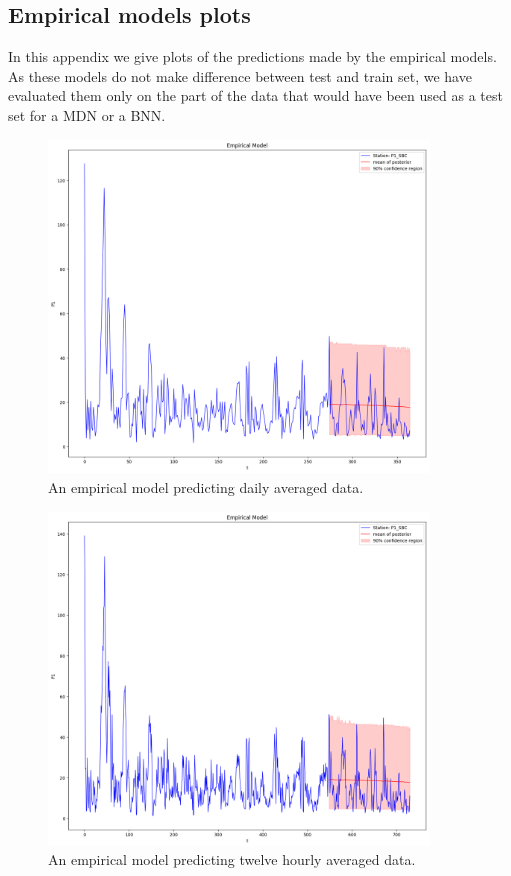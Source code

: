 \documentclass[12pt,a4paper,twoside]{scrartcl}
\numberwithin{equation}{section}
\newcounter{mypagecount}%
\newenvironment{interlude}{%
  \clearpage
  \setcounter{mypagecount}{\value{page}}%
  \thispagestyle{empty}%
  \pagestyle{empty}%
}{%
  \clearpage
  \setcounter{page}{\value{mypagecount}}%
}
\let\chapter=\section %
\begin{document}
\begin{interlude}
\begin{appendices}
    \chapter{Empirical models plots}\label{app:h}
    In this appendix we give plots of the predictions made by the empirical models. As these models do not make difference between test and train set, we have evaluated them only on the part of the data that would have been used as a test set for a MDN or a BNN.

    \begin{center}
      \begin{figure}[h!]
        \centering
        \includegraphics[height=0.5\textwidth, width=0.9\textwidth]{figures/model_plots/emp-1d}
        \caption[Empirical one day plot]{An empirical model predicting daily averaged data.}\label{fig:emp-1d}
      \end{figure}
    \end{center}
    \begin{center}
      \begin{figure}[h!]
        \centering
        \includegraphics[height=0.5\textwidth, width=0.9\textwidth]{figures/model_plots/emp-12h}
        \caption[Empirical twelve hour plot]{An empirical model predicting twelve hourly averaged data.}\label{fig:emp-12h}

\end{figure}
\end{center}
\end{appendices}
\end{interlude}
\end{document}
